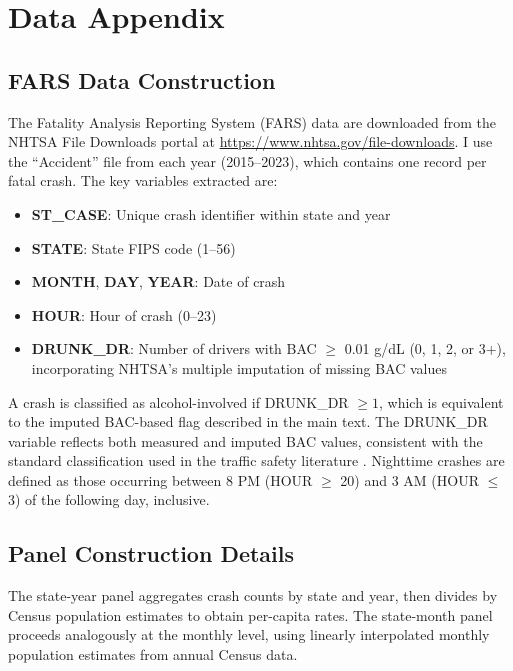 \documentclass[12pt]{article}
\begin{document}
\label{apep_main_text_end}
\newpage


\newpage
\appendix

\section{Data Appendix}
\label{app:data}

\subsection{FARS Data Construction}

The Fatality Analysis Reporting System (FARS) data are downloaded from the NHTSA File Downloads portal at \url{https://www.nhtsa.gov/file-downloads}. I use the ``Accident'' file from each year (2015--2023), which contains one record per fatal crash. The key variables extracted are:

\begin{itemize}
\item \textbf{ST\_CASE}: Unique crash identifier within state and year
\item \textbf{STATE}: State FIPS code (1--56)
\item \textbf{MONTH}, \textbf{DAY}, \textbf{YEAR}: Date of crash
\item \textbf{HOUR}: Hour of crash (0--23)
\item \textbf{DRUNK\_DR}: Number of drivers with BAC $\geq$ 0.01 g/dL (0, 1, 2, or 3+), incorporating NHTSA's multiple imputation of missing BAC values
\end{itemize}

A crash is classified as alcohol-involved if DRUNK\_DR $\geq 1$, which is equivalent to the imputed BAC-based flag described in the main text. The DRUNK\_DR variable reflects both measured and imputed BAC values, consistent with the standard classification used in the traffic safety literature \citep{carpenter2011effect}. Nighttime crashes are defined as those occurring between 8 PM (HOUR $\geq$ 20) and 3 AM (HOUR $\leq$ 3) of the following day, inclusive.

\subsection{Panel Construction Details}

The state-year panel aggregates crash counts by state and year, then divides by Census population estimates to obtain per-capita rates. The state-month panel proceeds analogously at the monthly level, using linearly interpolated monthly population estimates from annual Census data.
\end{document}
